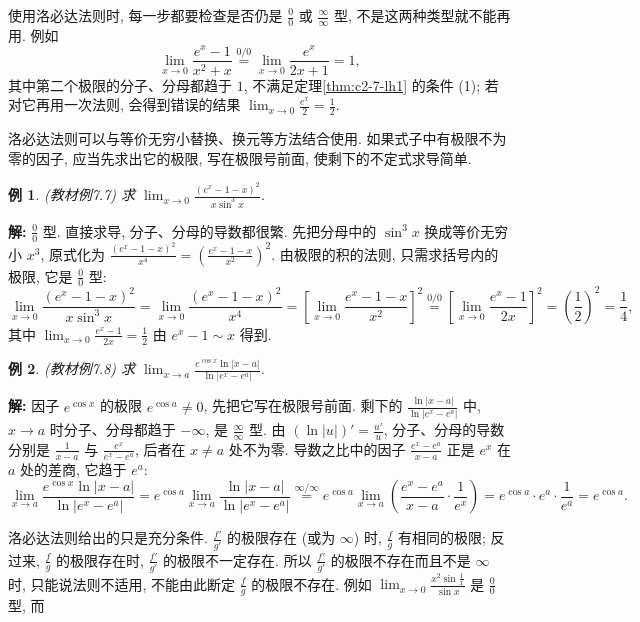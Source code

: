 \documentclass[UTF8,openany]{ctexbook}
\theoremstyle{chinesetextbook}
\newtheorem{example}{例}[section]
\newenvironment{cnsolution}{\par\indent\textbf{解:} \ignorespaces}{\par}
\begin{document}
使用洛必达法则时, 每一步都要检查是否仍是 $\displaystyle\frac00$ 或 $\displaystyle\frac\infty\infty$ 型, 不是这两种类型就不能再用. 例如
\[
\lim_{x\to0}\frac{e^x-1}{x^2+x}\overset{0/0}{=}\lim_{x\to0}\frac{e^x}{2x+1}=1,
\]
其中第二个极限的分子、分母都趋于 $1$, 不满足定理\ref{thm:c2-7-lh1} 的条件 (1); 若对它再用一次法则, 会得到错误的结果 $\displaystyle\lim_{x\to0}\frac{e^x}2=\frac12$.

洛必达法则可以与等价无穷小替换、换元等方法结合使用. 如果式子中有极限不为零的因子, 应当先求出它的极限, 写在极限号前面, 使剩下的不定式求导简单.
\begin{example}\label{ex:c2-7-7}
\textnormal{(教材例7.7)} 求 $\displaystyle\lim_{x\to0}\frac{(e^x-1-x)^2}{x\sin^3x}$.
\end{example}
\begin{cnsolution}
$\displaystyle\frac00$ 型. 直接求导, 分子、分母的导数都很繁. 先把分母中的 $\sin^3x$ 换成等价无穷小 $x^3$, 原式化为 $\displaystyle\frac{(e^x-1-x)^2}{x^4}=\left(\frac{e^x-1-x}{x^2}\right)^2$. 由极限的积的法则, 只需求括号内的极限, 它是 $\displaystyle\frac00$ 型:
\[
\lim_{x\to0}\frac{(e^x-1-x)^2}{x\sin^3x}=\lim_{x\to0}\frac{(e^x-1-x)^2}{x^4}=\left[\lim_{x\to0}\frac{e^x-1-x}{x^2}\right]^2\overset{0/0}{=}\left[\lim_{x\to0}\frac{e^x-1}{2x}\right]^2=\left(\frac12\right)^2=\frac14,
\]
其中 $\displaystyle\lim_{x\to0}\frac{e^x-1}{2x}=\frac12$ 由 $e^x-1\sim x$ 得到.
\end{cnsolution}
\begin{example}\label{ex:c2-7-8}
\textnormal{(教材例7.8)} 求 $\displaystyle\lim_{x\to a}\frac{e^{\cos x}\ln|x-a|}{\ln|e^x-e^a|}$.
\end{example}
\begin{cnsolution}
因子 $e^{\cos x}$ 的极限 $e^{\cos a}\ne0$, 先把它写在极限号前面. 剩下的 $\displaystyle\frac{\ln|x-a|}{\ln|e^x-e^a|}$ 中, $x\to a$ 时分子、分母都趋于 $-\infty$, 是 $\displaystyle\frac\infty\infty$ 型. 由 $\displaystyle(\ln|u|)'=\frac{u'}u$, 分子、分母的导数分别是 $\displaystyle\frac1{x-a}$ 与 $\displaystyle\frac{e^x}{e^x-e^a}$, 后者在 $x\ne a$ 处不为零. 导数之比中的因子 $\displaystyle\frac{e^x-e^a}{x-a}$ 正是 $e^x$ 在 $a$ 处的差商, 它趋于 $e^a$:
\[
\lim_{x\to a}\frac{e^{\cos x}\ln|x-a|}{\ln|e^x-e^a|}=e^{\cos a}\lim_{x\to a}\frac{\ln|x-a|}{\ln|e^x-e^a|}\overset{\infty/\infty}{=}e^{\cos a}\lim_{x\to a}\left(\frac{e^x-e^a}{x-a}\cdot\frac1{e^x}\right)=e^{\cos a}\cdot e^a\cdot\frac1{e^a}=e^{\cos a}.
\]
\end{cnsolution}
洛必达法则给出的只是充分条件. $\displaystyle\frac{f'}{g'}$ 的极限存在 (或为 $\infty$) 时, $\displaystyle\frac fg$ 有相同的极限; 反过来, $\displaystyle\frac fg$ 的极限存在时, $\displaystyle\frac{f'}{g'}$ 的极限不一定存在. 所以 $\displaystyle\frac{f'}{g'}$ 的极限不存在而且不是 $\infty$ 时, 只能说法则不适用, 不能由此断定 $\displaystyle\frac fg$ 的极限不存在. 例如 $\displaystyle\lim_{x\to0}\frac{x^2\sin\frac1x}{\sin x}$ 是 $\displaystyle\frac00$ 型, 而
\end{document}
